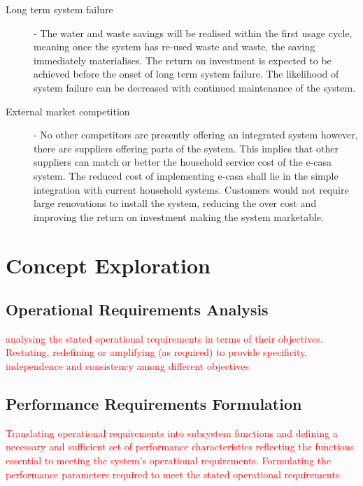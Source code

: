 \documentclass[a4paper,11pt,fleqn]{report}
\begin{document}
\begin{description}
	\item[Long term system failure] - The water and waste savings will be realised within the first usage cycle, meaning once the system has re-used waste and waste, the saving immediately materialises. The return on investment is expected to be achieved before the onset of long term system failure. The likelihood of system failure can be decreased with continued maintenance of the system.
	\item[External market competition] - No other competitors are presently offering an integrated system however, there are suppliers offering parts of the system. This implies that other suppliers can match or better the household service cost of the \ac{e-casa} system. The reduced cost of implementing e-casa shall lie in the simple integration with current household systems. Customers would not require large renovations to install the system, reducing the over cost and improving the return on investment making the system marketable.
\end{description}


\section{Concept Exploration}
\subsection{Operational Requirements Analysis}
\textcolor{red}{analysing the stated operational requirements in terms of their
objectives. Restating, redefining or amplifying (as required) to provide specificity, independence and consistency among different objectives}

\subsection{Performance Requirements Formulation}
\textcolor{red}{Translating operational requirements into subsystem functions and defining a necessary and sufficient set of performance characteristics reflecting the functions essential to meeting the system’s operational requirements. Formulating the performance parameters required to meet the stated operational requirements.}
\end{document}
